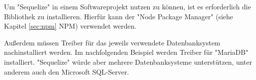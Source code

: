 
Um "Sequelize" in einem Softwareprojekt nutzen zu können, ist es erforderlich die Bibliothek zu installieren. Hierfür kann der "Node Package Manager" (siehe Kapitel \ref{sec:npm} NPM) verwendet werden.


\cite{Sequelize}

Außerdem müssen Treiber für das jeweils verwendete Datenbanksystem nachinstalliert werden. Im nachfolgenden Beispiel werden Treiber für "MariaDB" installiert. "Sequelize" würde aber mehrere Datenbanksysteme unterstützen, unter anderem auch den Microsoft SQL-Server.


\cite{SequInstall}
